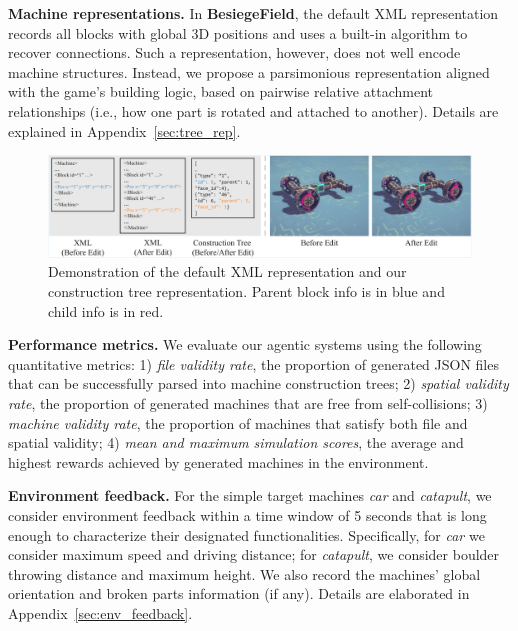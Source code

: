 \documentclass{article} %
\newcommand{\envname}{\textbf{BesiegeField}\xspace}
\theoremstyle{plain}
\theoremstyle{definition}
\begin{document}
\vspace{-.5mm}

\textbf{Machine representations.} In \envname, the default XML representation records all blocks with global 3D positions and uses a built-in algorithm to recover connections. Such a representation, however, does not well encode machine structures. Instead, we propose a parsimonious representation aligned with the game’s building logic, based on pairwise relative attachment relationships (i.e., how one part is rotated and attached to another). Details are explained in Appendix~\ref{sec:tree_rep}.
\vspace{-.5mm}

\begin{figure}[t!]
  \centering
  \includegraphics[width=0.98\linewidth]{figures/xml_intro_v2_cropped.pdf}
  \vspace{-2.5mm}
  \captionsetup{font=footnotesize} %
  \caption{\footnotesize Demonstration of the default XML representation and our construction tree representation. Parent block info is in blue and child info is in red.}
  \label{fig:XML-intro}
  \vspace{-4.5mm}
\end{figure}

\textbf{Performance metrics.} We evaluate our agentic systems using the following quantitative metrics: 1) \textit{file validity rate}, the proportion of generated JSON files that can be successfully parsed into machine construction trees; 2) \textit{spatial validity rate}, the proportion of generated machines that are free from self-collisions; 3) \textit{machine validity rate}, the proportion of machines that satisfy both file and spatial validity; 4) \textit{mean and maximum simulation scores}, the average and highest rewards achieved by generated machines in the environment.

\textbf{Environment feedback.} For the simple target machines \textit{car} and \textit{catapult}, we consider environment feedback within a time window of 5 seconds that is long enough to characterize their designated functionalities. Specifically, for \textit{car} we consider maximum speed and driving distance; for \textit{catapult}, we consider boulder throwing distance and maximum height. We also record the machines' global orientation and broken parts information (if any). Details are elaborated in Appendix~\ref{sec:env_feedback}.
\end{document}
